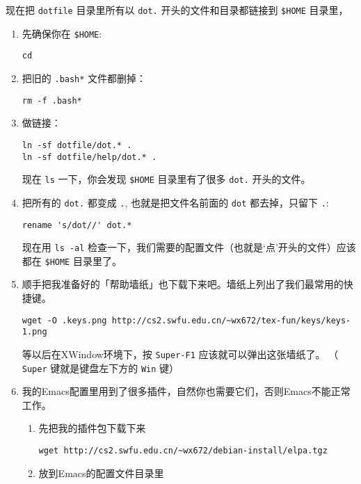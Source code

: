 \documentclass{wx672ctexart}
\begin{document}
现在把 \texttt{dotfile} 目录里所有以 \texttt{dot.} 开头的文件和目录都链接到 \texttt{\$HOME} 目录里，
\begin{enumerate}
\item 先确保你在 \texttt{\$HOME}:
\begin{verbatim}
cd
\end{verbatim}
\item 把旧的 \texttt{.bash*} 文件都删掉：
\begin{verbatim}
rm -f .bash*
\end{verbatim}
\item 做链接：
\begin{verbatim}
ln -sf dotfile/dot.* .
ln -sf dotfile/help/dot.* .
\end{verbatim}
现在 \texttt{ls} 一下，你会发现 \texttt{\$HOME} 目录里有了很多 \texttt{dot.} 开头的文件。
\item 把所有的 \texttt{dot.} 都变成 \texttt{.}, 也就是把文件名前面的 \texttt{dot} 都去掉，只留下 \texttt{.}:
\begin{verbatim}
rename 's/dot//' dot.*
\end{verbatim}
现在用 \texttt{ls -al} 检查一下，我们需要的配置文件（也就是‘点’开头的文件）应该都在 \texttt{\$HOME} 目录里了。
\item 顺手把我准备好的「帮助墙纸」也下载下来吧。墙纸上列出了我们最常用的快捷键。
\begin{verbatim}
wget -O .keys.png http://cs2.swfu.edu.cn/~wx672/tex-fun/keys/keys-1.png
\end{verbatim}
 等以后在XWindow环境下，按 \texttt{Super-F1} 应该就可以弹出这张墙纸了。
（ \texttt{Super} 键就是键盘左下方的 \texttt{Win} 键）
\item 我的Emacs配置里用到了很多插件，自然你也需要它们，否则Emacs不能正常工作。
\begin{enumerate}
\item 先把我的插件包下载下来
\begin{verbatim}
wget http://cs2.swfu.edu.cn/~wx672/debian-install/elpa.tgz
\end{verbatim}
\item 放到Emacs的配置文件目录里
\begin{verbatim}

\end{verbatim}
\end{enumerate}
\end{enumerate}
\end{document}
